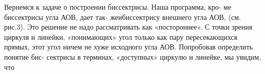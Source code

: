 \begin{multicols}{3}
Вернемся к задаче о построении
биссектрисы. Наша программа, кро-
ме биссектрисы угла АОВ, дает так-
жеибиссектрису внешнего угла АОВ,
(см. рис.3). Это решение не надо
рассматривать как «постороннее». С
точки зрения циркуля и линейки,
«понимающих» угол только как пару
пересекающихся прямых, этот угол
ничем не хуже исходного угла АОВ.
Попробовав определить понятие бис-
сектрисы в терминах, «доступных»
циркулю и линейке, мы увидим, что
\end{multicols}